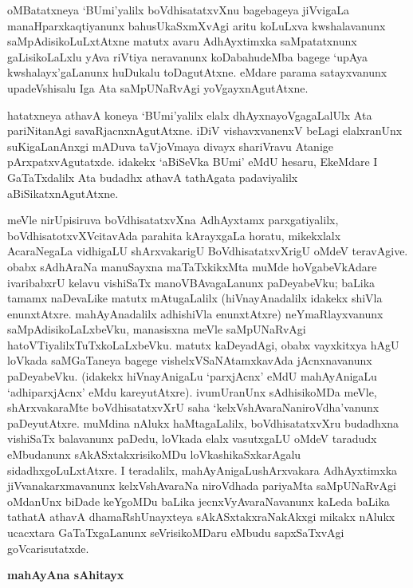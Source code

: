 oMBatatxneya `BUmi'yalilx boVdhisatatxvXnu bagebageya jiVvigaLa manaHparxkaqti\-yanunx bahusUkaSxmXvAgi aritu koLuLxva kwshalavanunx saMpAdisikoLuLxtAtxne matutx avaru AdhAyxtimxka saMpatatxnunx gaLisikoLaLxlu yAva riVtiya neravanunx koDabahudeMba bagege `upAya kwshalayx'gaLanunx huDukalu toDagutAtxne. eMdare parama satayxvanunx upadeVshisalu Iga Ata saMpUNaRvAgi yoVgayxnAgutAtxne.

hatatxneya athavA koneya `BUmi'yalilx elalx dhAyxnayoVgagaLalUlx Ata pariNitanAgi savaRjacnxnAgutAtxne. iDiV vishavxvanenxV beLagi elalxranUnx suKigaLanAnxgi mADuva taVjoVmaya divayx shariVravu Atanige pArxpatxvAgutatxde. idakekx `aBiSeVka BUmi' eMdU hesaru, EkeMdare I GaTaTxdalilx Ata budadhx athavA tathAgata padaviyalilx aBiSikatxnAgutAtxne.

meVle nirUpisiruva boVdhisatatxvXna AdhAyxtamx parxgatiyalilx, boVdhisatotxvXVcitavAda parahita kArayxgaLa horatu, mikekxlalx AcaraNegaLa vidhigaLU shArxvakarigU BoVdhisatatxvXrigU oMdeV teravAgive. obabx sAdhAraNa manuSayxna maTaTxkikxMta muMde hoVgabeVkAdare ivaribabxrU kelavu vishiSaTx manoVBAvagaLanunx paDeyabeVku; baLika tamamx naDevaLike matutx mAtugaLalilx (hiVnayAnadalilx idakekx shiVla enunxtAtxre. mahAyAnadalilx adhi\-shiVla enunxtAtxre) neYmaRlayxvanunx saMpAdisikoLaLxbeVku, manasisxna meVle saMpUNaR\-vAgi hatoVTiyalilxTuTxkoLaLxbeVku. matutx kaDeyadAgi, obabx vayxkitxya hAgU loVkada saMGaTaneya bagege vishelxVSaNAtamxkavAda jAcnxnavanunx paDeyabeVku. (idakekx hiVnayAni\break\-gaLu `parxjAcnx' eMdU mahAyAnigaLu `adhiparxjAcnx' eMdu kareyutAtxre). ivu\break mUranUnx sAdhisikoMDa meVle, shArxvakaraMte boVdhisatatxvXrU saha `kelxVshAvaraNa\break niroVdha'vanunx paDeyutAtxre. muMdina nAlukx haMtagaLalilx, boVdhisatatxvXru \hbox{budadhxna} vishiSaTx balavanunx paDedu, loVkada elalx vasutxgaLU oMdeV taradudx eMbudanunx sAkASx\break\-takxrisikoMDu loVkashikaSxkarAgalu sidadhxgoLuLxtAtxre. I teradalilx, mahAyAnigaLu\break shArxvakara AdhAyxtimxka jiVvanakarxmavanunx kelxVshAvaraNa niroVdhada pariyaMta saMpUNaR\-vAgi oMdanUnx biDade keYgoMDu baLika jecnxVyAvaraNavanunx kaLeda baLika tathatA athavA dhamaRshUnayxteya sAkASxtakxraNakAkxgi mikakx nAlukx ucacxtara GaTaTxgaLanunx seVrisikoMDaru eMbudu sapxSaTxvAgi goVcarisutatxde.

\begin{center}
{\textbf{\Large mahAyAna sAhitayx}}
\end{center}

